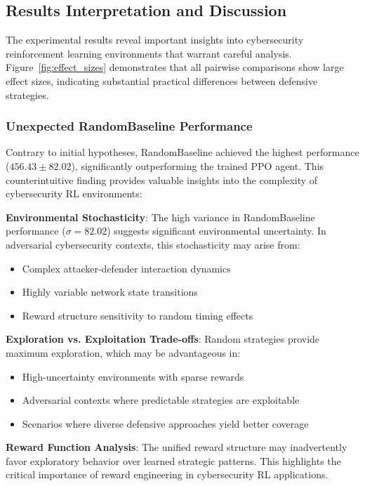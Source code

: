 \documentclass[12pt]{article}
\theoremstyle{definition}
\theoremstyle{plain}
\begin{document}
\subsection{Results Interpretation and Discussion}

The experimental results reveal important insights into cybersecurity reinforcement learning environments that warrant careful analysis. Figure~\ref{fig:effect_sizes} demonstrates that all pairwise comparisons show large effect sizes, indicating substantial practical differences between defensive strategies.

\subsubsection{Unexpected RandomBaseline Performance}

Contrary to initial hypotheses, RandomBaseline achieved the highest performance ($456.43 \pm 82.02$), significantly outperforming the trained PPO agent. This counterintuitive finding provides valuable insights into the complexity of cybersecurity RL environments:

\textbf{Environmental Stochasticity}: The high variance in RandomBaseline performance ($\sigma = 82.02$) suggests significant environmental uncertainty. In adversarial cybersecurity contexts, this stochasticity may arise from:
\begin{itemize}
    \item Complex attacker-defender interaction dynamics
    \item Highly variable network state transitions
    \item Reward structure sensitivity to random timing effects
\end{itemize}

\textbf{Exploration vs. Exploitation Trade-offs}: Random strategies provide maximum exploration, which may be advantageous in:
\begin{itemize}
    \item High-uncertainty environments with sparse rewards
    \item Adversarial contexts where predictable strategies are exploitable
    \item Scenarios where diverse defensive approaches yield better coverage
\end{itemize}

\textbf{Reward Function Analysis}: The unified reward structure may inadvertently favor exploratory behavior over learned strategic patterns. This highlights the critical importance of reward engineering in cybersecurity RL applications.
\end{document}
